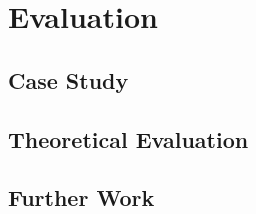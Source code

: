 \chapter{Evaluation}

\section{Case Study} \label{sec_casestudy}

\section{Theoretical Evaluation} \label{sec_theoeval}

\section{Further Work} \label{sec_furtherwork}

